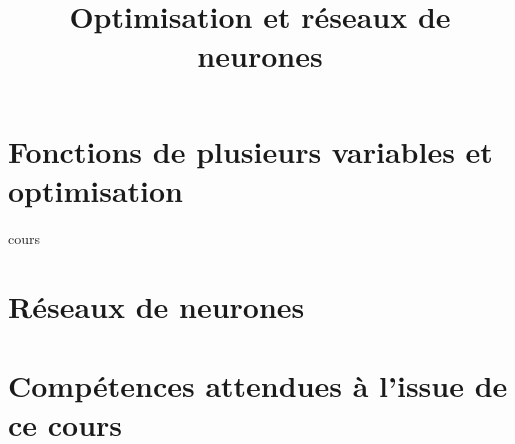 \documentclass[fleqn,a4paper,11pt]{book}
\title{Optimisation et réseaux de neurones}
\begin{document}
\maketitle
\tableofcontents
\newpage

\newcommand{\myscale}{1}
\newcommand{\couleurnb}[2]{#2}
\newcommand{\mybox}[1]{\begin{center}\tikz{\node[block]{#1};}\end{center}}

\chapter{Fonctions de plusieurs variables et optimisation}

{cours}

\newpage

\chapter{Réseaux de neurones}

\newpage



\appendix
\chapter{Compétences attendues à l'issue de ce cours}

\end{document}
